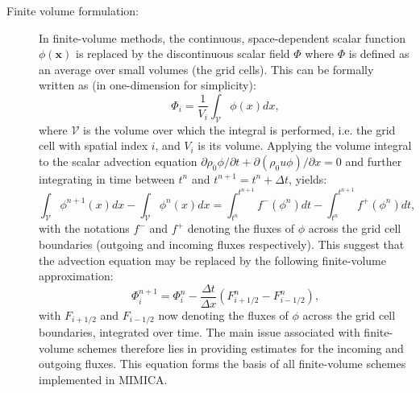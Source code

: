 \documentclass[12pt,A4,french]{article}
\begin{document}
\begin{description}

\item[Finite volume formulation:]
In finite-volume methods, the continuous, space-dependent scalar function $\phi\left(\mathbf{x}\right)$ is replaced by the discontinuous scalar field $\Phi$ where $\Phi$ is defined as an average over small volumes (the grid cells). This can be formally written as  \cite{Lev2002} (in one-dimension for simplicity):
\begin{equation}
    \Phi_{i} = \frac{1}{V_{i}} \int_{\mathcal{V}} \phi\left(x\right) dx,
\end{equation}
where $\mathcal{V}$ is the volume over which the integral is performed, i.e. the grid cell with spatial index $i$, and $V_{i}$ is its volume. Applying the  volume integral to the scalar advection equation $\partial \rho_0 \phi/\partial t + \partial\left( \rho_0 u \phi \right)/\partial x =0$ and further integrating in time between $t^n$ and $t^{n+1} = t^n + \Delta t$, yields:
\begin{equation}
    \int_{\mathcal{V}} \phi^{n+1}\left(x\right) dx - \int_{\mathcal{V}} \phi^n\left(x\right) dx = \int_{t^n}^{t^{n+1}} f^-\left(\phi^n\right) dt - \int_{t^n}^{t^{n+1}} f^+\left(\phi^n\right) dt,
    \label{integral}
\end{equation}
with the notations $f^-$ and $f^+$ denoting the fluxes of $\phi$ across the grid cell boundaries (outgoing and incoming fluxes respectively). This suggest that the advection equation may be replaced by the following finite-volume approximation:
\begin{equation}
    \Phi^{n+1}_{i} = \Phi^n_{i} - \frac{\Delta t}{\Delta x}\left(F^n_{i+1/2} - F^n_{i-1/2}\right),
\end{equation}
with $F_{i+1/2}$ and $F_{i-1/2}$ now denoting the fluxes of $\phi$ across the grid cell boundaries, integrated over time. The main issue associated with finite-volume schemes therefore lies in providing estimates for the incoming and outgoing fluxes. This equation forms the basis of all finite-volume schemes implemented in MIMICA.


\end{description}
\end{document}
